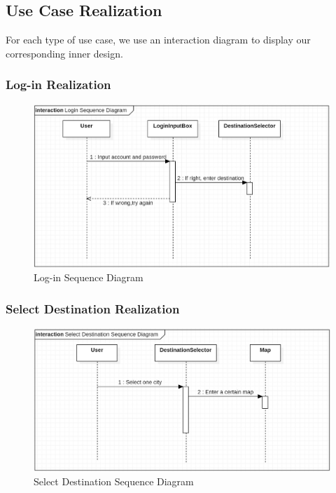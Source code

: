 \documentclass[10pt]{article}
\begin{document}
\subsection{Use Case Realization}
For each type of use case, we use an interaction diagram to display our corresponding inner design.

\subsubsection{Log-in Realization}
\begin{figure}[H]
    \centering
    
    \includegraphics[width=14cm]{login.jpg}
    \caption{Log-in Sequence Diagram}
    \label{Log-in Sequence Diagram}
\end{figure}

\subsubsection{Select Destination Realization}
\begin{figure}[H]
    \centering
    
    \includegraphics[width=14cm]{destination.jpg}
    \caption{Select Destination Sequence Diagram}
    \label{Select Destination Sequence Diagram}
\end{figure}
\end{document}
